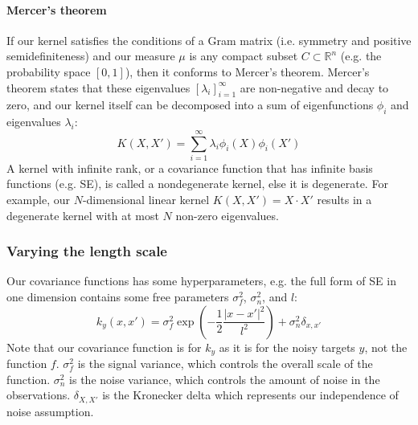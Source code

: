 \paragraph{Mercer's theorem}
If our kernel satisfies the conditions of a Gram matrix (i.e. symmetry and positive semidefiniteness) and our measure $\mu$ is any compact subset $C \subset \mathbb{R}^n$ (e.g. the probability space $[0,1]$), then it conforms to Mercer's theorem. Mercer's theorem states that these eigenvalues $[\lambda_i]_{i=1}^\infty$ are non-negative and decay to zero, and our kernel itself can be decomposed into a sum of eigenfunctions $\phi_i$ and eigenvalues $\lambda_i$:
\begin{equation} \label{eq:gp_mercer}
    K(X, X') = \sum_{i=1}^{\infty} \lambda_i \phi_i(X) \phi_i(X')
\end{equation}
A kernel with infinite rank, or a covariance function that has infinite basis functions (e.g. SE), is called a nondegenerate kernel, else it is degenerate. For example, our $N$-dimensional linear kernel $K(X, X') = X \cdot X'$ results in a degenerate kernel with at most $N$ non-zero eigenvalues.


\subsubsection{Varying the length scale}
Our covariance functions has some hyperparameters, e.g. the full form of SE in one dimension contains some free parameters $\sigma^2_f$, $\sigma^2_n$, and $l$:
\begin{equation*}
    k_y(x,x') = \sigma^2_f \exp\left(-\frac{1}{2}\frac{|x - x'|^2}{l^2}\right) + \sigma^2_n\delta_{x,x'}
\end{equation*}
Note that our covariance function is for $k_y$ as it is for the noisy targets $y$, not the function $f$. $\sigma^2_f$ is the signal variance, which controls the overall scale of the function. $\sigma^2_n$ is the noise variance, which controls the amount of noise in the observations. $\delta_{X,X'}$ is the Kronecker delta which represents our independence of noise assumption.

